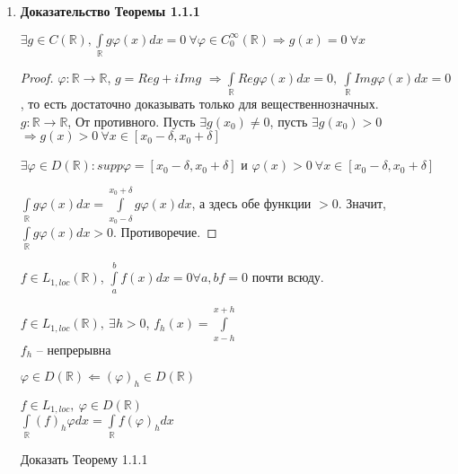 \begin{enumerate}
    \item \textbf{Доказательство Теоремы 1.1.1} \\
    \begin{lemma}
        $\exists g \in C(\mathbb{R}), \int\limits_{\mathbb{R}} g \varphi(x) d x = 0 \ \forall \varphi \in C_0^{\infty}(\mathbb{R}) \Rightarrow g(x) = 0 \ \forall x$
        \begin{proof}
            $\varphi: \mathbb{R} \to \mathbb{R}$, $g = Re g + i Im g$ $\Rightarrow \int\limits_{\mathbb{R}} Re g \varphi(x) d x = 0, \ \int\limits_{\mathbb{R}} Im g \varphi(x) d x = 0$, то есть достаточно доказывать только для вещественнозначных. \\
            $g: \mathbb{R} \to \mathbb{R}$, От противного. Пусть $\exists g(x_0) \neq 0 $, пусть $\exists g (x_0) > 0$ $\Rightarrow g(x) > 0 \ \forall x \in [x_0 - \delta, x_0 + \delta]$
            \begin{exercise}
                $\exists \varphi \in D(\mathbb{R}): supp \varphi = [x_0 - \delta, x_0 + \delta]$ и $\varphi(x) > 0 \ \forall x \in [x_0 - \delta, x_0 + \delta]$
            \end{exercise}
            $\int\limits_{\mathbb{R}} g \varphi(x) d x = \int\limits_{x_0 - \delta}^{x_0 + \delta} g \varphi(x) d x$, а здесь обе функции $> 0$. Значит,  $\int\limits_{\mathbb{R}} g \varphi(x) d x > 0$. Противоречие.
        \end{proof}
    \end{lemma}
    \begin{exercise}
        $f \in L_{1, loc} (\mathbb{R})$, $\int\limits_a^b f(x) d x = 0 \forall a, b f = 0$ почти всюду.
    \end{exercise}
    \begin{exercise}
         $f \in L_{1, loc} (\mathbb{R}), \ \exists h > 0$, $f_h (x) = \int\limits_{x - h}^{x + h}$\\
         $f_h$ -- непрерывна
    \end{exercise}
    \begin{exercise}
        $\varphi \in D(\mathbb{R}) \Leftarrow (\varphi)_h \in D(\mathbb{R})$
    \end{exercise}
    \begin{exercise}
        $f \in L_{1, loc}, \ \varphi \in D(\mathbb{R})$ \\
        $\int\limits_{\mathbb{R}} (f)_h \varphi d x = \int\limits_{\mathbb{R}} f (\varphi)_h d x$
    \end{exercise}
    \begin{exercise}
        Доказать Теорему 1.1.1
    \end{exercise}
\end{enumerate}
